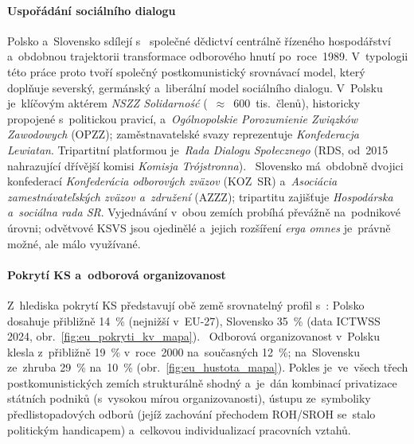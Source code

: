 
\paragraph{Uspořádání sociálního dialogu}\label{par:plsk_architektura}
Polsko a~Slovensko sdílejí s~ společné dědictví centrálně řízeného
hospodářství a~obdobnou trajektorii transformace odborového hnutí po~roce~1989.
V~typologii této práce proto tvoří společný postkomunistický srovnávací model,
který doplňuje severský, germánský a~liberální model sociálního dialogu.
V~Polsku je~klíčovým aktérem \textit{NSZZ Solidarność} (~$\approx$~600~tis.~členů),
historicky propojené s~politickou pravicí, a~\textit{Ogólnopolskie Porozumienie
Związków Zawodowych} (OPZZ); zaměstnavatelské svazy reprezentuje
\textit{Konfederacja Lewiatan}. Tripartitní platformou je~\textit{Rada Dialogu
Społecznego} (RDS, od~2015 nahrazující dřívější komisi
\textit{Komisja Trójstronna}).~\cite{Hala_SystemySocialnihoDialogu2013}
Slovensko má~obdobně dvojici konfederací \textit{Konfederácia odborových
zväzov} (KOZ~SR) a~\textit{Asociácia zamestnávateľských zväzov a~združení}
(AZZZ); tripartitu zajišťuje \textit{Hospodárska a~sociálna rada SR}.
Vyjednávání v~obou zemích probíhá převážně na~podnikové úrovni; odvětvové
\acs{KSVS} jsou ojedinělé a~jejich rozšíření \emph{erga omnes} je~právně
možné, ale málo využívané.~\cite{Eurofound_KeyDimensionsIR_2023}

\paragraph{Pokrytí \acs{KS} a~odborová organizovanost}\label{par:plsk_pokryti}
Z~hlediska pokrytí \acs{KS} představují obě země srovnatelný profil
s~: Polsko dosahuje přibližně \SI{14}{\percent} (nejnižší v~EU-27),
Slovensko \SI{35}{\percent} (data \acs{ICTWSS} 2024,
obr.~\ref{fig:eu_pokryti_kv_mapa}).~\cite{OECD_UnionEmployerCoverage_2025}
Odborová organizovanost v~Polsku klesla z~přibližně \SI{19}{\percent} v~roce~2000
na~současných \SI{12}{\percent}; na~Slovensku ze~zhruba \SI{29}{\percent}
na~\SI{10}{\percent} (obr.~\ref{fig:eu_hustota_mapa}). Pokles je~ve~všech třech
postkomunistických zemích strukturálně shodný a~je~dán kombinací privatizace
státních podniků (s~vysokou mírou organizovanosti), ústupu ze~symboliky
předlistopadových odborů (jejíž zachování přechodem ROH/SROH se~stalo
politickým handicapem) a~celkovou individualizací pracovních
vztahů.~\cite{Eurofound_KeyDimensionsIR_2023}~\cite{Hala_SystemySocialnihoDialogu2013}


